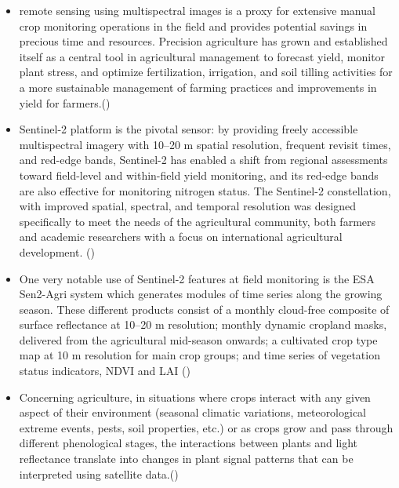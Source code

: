 \documentclass[12pt, letterpaper]{article}
\begin{document}
\begin{itemize}
  \item remote sensing using multispectral images is a proxy for extensive manual crop monitoring operations in the field and provides potential savings in precious time and resources. Precision agriculture has grown and established itself as a central tool in agricultural management to forecast yield, monitor plant stress, and optimize fertilization, irrigation, and soil tilling activities for a more sustainable management of farming practices and improvements in yield for farmers.(\textbf{\cite{segarra_remote_2020}})
  \item Sentinel-2 platform is the pivotal sensor: by providing freely accessible multispectral imagery with 10–20 m spatial resolution, frequent revisit times, and red-edge bands, Sentinel-2 has enabled a shift from regional assessments toward field-level and within-field yield monitoring, and its red-edge bands are also effective for monitoring nitrogen status. The Sentinel-2 constellation, with improved spatial, spectral, and temporal resolution was designed specifically to meet the needs of the agricultural community, both farmers and academic researchers with a focus on international agricultural development. (\textbf{\cite{segarra_remote_2020}})
  \item One very notable use of Sentinel-2 features at field monitoring is the ESA Sen2-Agri system which generates modules of time series along the growing season. These different products consist of a monthly cloud-free composite of surface reflectance at 10–20 m resolution; monthly dynamic cropland masks, delivered from the agricultural mid-season onwards; a cultivated crop type map at 10 m resolution for main crop groups; and time series of vegetation status indicators, NDVI and LAI (\textbf{\cite{segarra_remote_2020}})
  \item Concerning agriculture, in situations where crops interact with any given aspect of their environment (seasonal climatic variations, meteorological extreme events, pests, soil properties, etc.) or as crops grow and pass through different phenological stages, the interactions between plants and light reflectance translate into changes in plant signal patterns that can be interpreted using satellite data.(\textbf{\cite{segarra_remote_2020}})
\end{itemize}




\clearpage
\thispagestyle{plain} 
\printbibliography
\end{document}
